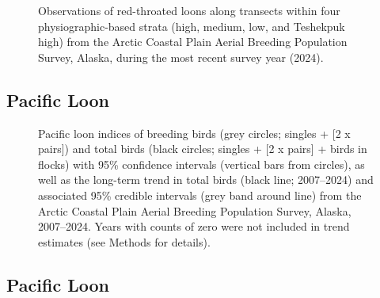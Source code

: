 \documentclass[
]{article}
\begin{document}
\begin{figure}


\caption{\label{fig-RTLOmap}Observations of red-throated loons along
transects within four physiographic-based strata (high, medium, low, and
Teshekpuk high) from the Arctic Coastal Plain Aerial Breeding Population
Survey, Alaska, during the most recent survey year (2024).}

\end{figure}%

\newpage{}

\subsection*{Pacific Loon}\label{pacific-loon}

\begin{figure}


\caption{\label{fig-PALO}Pacific loon indices of breeding birds (grey
circles; singles + {[}2 x pairs{]}) and total birds (black circles;
singles + {[}2 x pairs{]} + birds in flocks) with 95\% confidence
intervals (vertical bars from circles), as well as the long-term trend
in total birds (black line; 2007--2024) and associated 95\% credible
intervals (grey band around line) from the Arctic Coastal Plain Aerial
Breeding Population Survey, Alaska, 2007--2024. Years with counts of
zero were not included in trend estimates (see Methods for details).}

\end{figure}%

\newpage{}

\subsection*{Pacific Loon}\label{pacific-loon-1}

\begingroup\fontsize{10}{12}\selectfont
\end{document}
